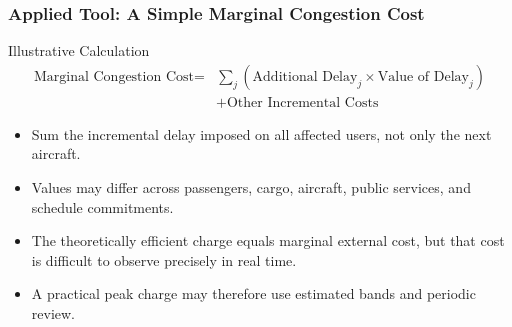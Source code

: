\documentclass{beamer}
\begin{document}
\begin{frame}[t]
\frametitle{Applied Tool: A Simple Marginal Congestion Cost}
\begin{block}{Illustrative Calculation}
\[
\begin{aligned}
\text{Marginal Congestion Cost} = {} & \sum_j \left(\text{Additional Delay}_j \times \text{Value of Delay}_j\right) \\
& {} + \text{Other Incremental Costs}
\end{aligned}
\]
\end{block}
\begin{itemize}
\item Sum the incremental delay imposed on all affected users, not only the next aircraft.
\item Values may differ across passengers, cargo, aircraft, public services, and schedule commitments.
\item The theoretically efficient charge equals marginal external cost, but that cost is difficult to observe precisely in real time.
\item A practical peak charge may therefore use estimated bands and periodic review.
\end{itemize}
\end{frame}
\end{document}
